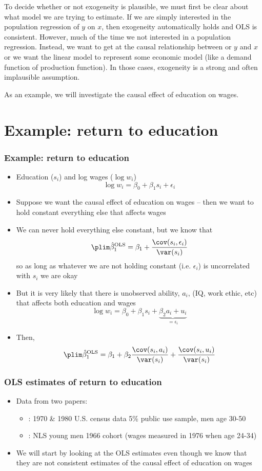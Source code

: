 To decide whether or not exogeneity is plausible, we must first be
clear about what model we are trying to estimate. If we are simply
interested in the population regression of $y$ on $x$, then exogeneity
automatically holds and OLS is consistent. However, much of the time
we not interested in a population regression. Instead, we want to get
at the causal relationship between or $y$ and $x$ or we want the
linear model to represent some economic model (like a demand function
of production function). In those cases, exogeneity is a strong and
often implausible assumption. 

As an example, we will investigate the causal effect of education on
wages. 

\section{Example: return to education}
\begin{frame}[allowframebreaks]\frametitle{Example: return to education}
  \begin{itemize}
  \item Education ($s_i$) and log wages ($\log w_i$) 
    \[ \log w_i = \beta_0 + \beta_1 s_i + \epsilon_i \]
  \item Suppose we want the causal effect of education on wages --
    then we want to hold constant everything else that affects wages 
  \item We can never hold everything else constant, but we know that 
    \[ \plim \bols_1 = \beta_1 +
    \frac{\cov(s_i,\epsilon_i)}{\var(s_i) } \]
    so as long as whatever we are not holding constant
    (i.e. $\epsilon_i$) is uncorrelated with $s_i$ we are okay
  \item But it is very likely that there is unobserved ability,
    $a_i$, (IQ,  work ethic, etc) that affects both education and wages
    \[ \log w_i = \beta_0 + \beta_1 s_i  + \underbrace{\beta_2 a_i
      + u_i}_{=\epsilon_i} \]
  \item Then, 
    \[ \plim \bols_1 = \beta_1 + \beta_2 \frac{\cov (s_i,
      a_i)}{\var(s_i)} + \frac{\cov(s_i,u_i)}{\var(s_i)} \]      
  \end{itemize}
\end{frame}

\begin{frame} \frametitle{OLS estimates of return to education}
  \begin{itemize}
  \item Data from two papers: 
    \begin{itemize}
    \item \cite{angrist1991}: 1970 \& 1980 U.S. census data 5\%
      public use sample, men age 30-50
    \item \cite{card1993}: NLS young men 1966 cohort (wages measured
      in 1976 when age 24-34)
    \end{itemize}
  \item We will start by looking at the OLS estimates even though we
    know that they are not consistent estimates of the causal effect
    of education on wages
  \end{itemize}
\end{frame}

